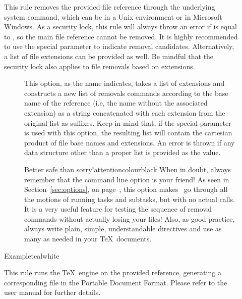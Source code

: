\begin{description}
\item[]
This rule removes the provided file reference through the underlying system command, which can be  in a Unix environment or  in Microsoft Windows. As a security lock, this rule will always throw an error if  is equal to , so the main file reference cannot be removed. It is highly recommended to use the special  parameter to indicate removal candidates. Alternatively, a list of file extensions can be provided as well. Be mindful that the security lock also applies to file removals based on extensions.

\begin{description}
\item[] This option, as the name indicates, takes a list of extensions and constructs a new list of removals commands according to the base name of the  reference (i.e, the name without the associated extension) as a string concatenated with each extension from the original list as suffixes. Keep in mind that, if the special  parameter is used with this option, the resulting list will contain the cartesian product of file base names and extensions. An error is thrown if any data structure other than a proper list is provided as the value.

\begin{messagebox}{Better safe than sorry!}{attentioncolour}{\icattention}{black}
When in doubt, always remember that the  command line option is your friend! As seen in Section~\ref{sec:options}, on page~\pageref{sec:options}, this option makes \arara\ go through all the motions of running tasks and subtasks, but with no actual calls. It is a very useful feature for testing the sequence of removal commands without actually losing your files! Also, as good practice, always write plain, simple, understandable  directives and use as many as needed in your \TeX\ documents.
\end{messagebox}
\end{description}

\begin{codebox}{Example}{teal}{\icnote}{white}
\end{codebox}

\item[]
This rule runs the  \TeX\ engine on the provided  reference, generating a corresponding file in the Portable Document Format. Please refer to the user manual for further details.


\end{description}
